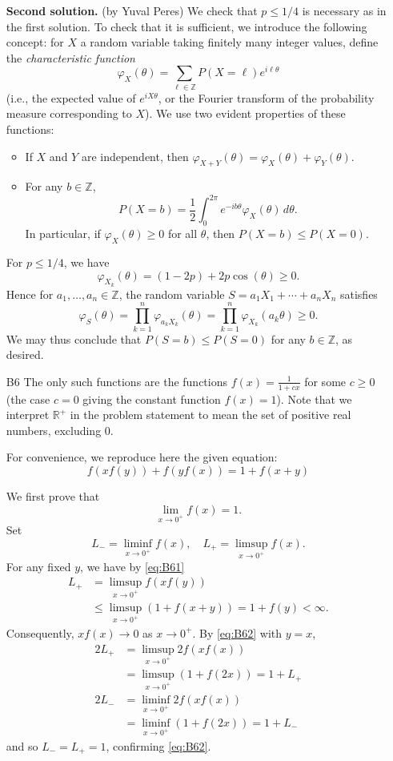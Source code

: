 \documentclass[amssymb,twocolumn,pra,10pt,aps]{revtex4-1}
\begin{document}
\begin{itemize}
\noindent
\textbf{Second solution.} (by Yuval Peres)
We check that $p \leq 1/4$ is necessary as in the first solution. To check that it is sufficient, we introduce the following concept: for $X$ a random variable taking finitely many integer values, define the \emph{characteristic function}
\[
\varphi_X(\theta) = \sum_{\ell \in \mathbb{Z}} P(X = \ell) e^{i \ell \theta}
\]
(i.e., the expected value of $e^{i X\theta}$, or 
the Fourier transform of the probability measure corresponding to $X$). We use two evident properties of these functions:
\begin{itemize}
\item
If $X$ and $Y$ are independent, then $\varphi_{X+Y}(\theta) = \varphi_X(\theta) + \varphi_Y(\theta)$.
\item
For any $b \in \mathbb{Z}$,
\[
P(X = b) = \frac{1}{2} \int_0^{2\pi} e^{-ib\theta} \varphi_X(\theta)\,d\theta.
\]
In particular, if $\varphi_X(\theta) \geq 0$ for all $\theta$, then
$P(X=b) \leq P(X = 0)$.
\end{itemize}

For $p \leq 1/4$, we have
\[
\varphi_{X_k}(\theta) = (1-2p) + 2p \cos (\theta) \geq 0.
\]
Hence for $a_1,\dots,a_n \in \mathbb{Z}$, the random variable $S = a_1 X_1 + \cdots + a_n X_n$ satisfies
\[
\varphi_S(\theta) = \prod_{k=1}^n \varphi_{a_kX_k}(\theta)
= \prod_{k=1}^n \varphi_{X_k}(a_k\theta) \geq 0.
\]
We may thus conclude that $P(S=b) \leq P(S=0)$ for any $b \in \mathbb{Z}$, as desired.

\item[B6]
The only such functions are the functions $f(x) = \frac{1}{1+cx}$
for some $c \geq 0$ (the case $c=0$ giving the constant function $f(x) = 1$). 
Note that we interpret $\mathbb{R}^+$ in the problem statement to mean the set of positive real numbers, excluding 0.

For convenience, we reproduce here the given equation:
\begin{equation} \label{eq:B61}
f(xf(y)) + f(yf(x)) = 1 + f(x+y)
\end{equation}

We first prove that
\begin{equation} \label{eq:B62}
\lim_{x \to 0^+} f(x) = 1.
\end{equation}
Set
\[
L_- = \liminf_{x \to 0^+} f(x),
\quad
L_+ = \limsup_{x \to 0^+} f(x).
\]
For any fixed $y$, we have by \eqref{eq:B61}
\begin{align*}
L_+ &= \limsup_{x \to 0^+} f(xf(y)) \\
&\leq \limsup_{x \to0^+} (1+f(x+y))
= 1+f(y) < \infty.
\end{align*}
Consequently, $xf(x) \to 0$ as $x \to 0^+$.
By \eqref{eq:B62} with $y=x$,
\begin{align*}
2L_+ &= \limsup_{x \to 0^+} 2f(xf(x)) \\
&= \limsup_{x \to 0^+} (1 + f(2x)) = 1 + L_+ \\
2L_- &= \liminf_{x \to 0^+} 2f(xf(x)) \\
&= \liminf_{x \to 0^+} (1 + f(2x)) = 1 + L_-
\end{align*}
and so $L_- = L_+ = 1$, confirming \eqref{eq:B62}.


\end{itemize}
\end{document}
